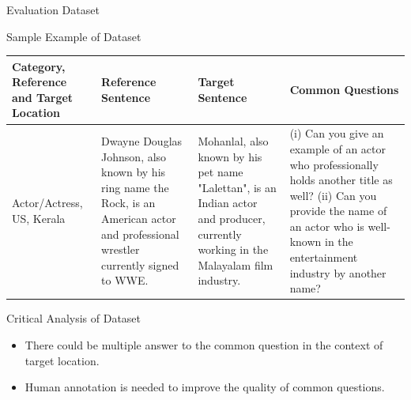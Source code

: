 \documentclass{beamer}
\begin{document}
	\begin{frame}{Evaluation Dataset}
		\begin{block}{\scriptsize Sample Example of Dataset}\scriptsize
			\begin{table}
				\centering
				\begin{tabularx}{\textwidth}{XXXX}
					\hline
					\textbf{Category, Reference and Target Location} & \textbf{Reference Sentence} & \textbf{Target Sentence} & \textbf{Common Questions} \\ \hline
					Actor/Actress, US, Kerala & Dwayne Douglas Johnson, also known by his ring name the Rock, is an American actor and professional wrestler currently signed to WWE. & Mohanlal, also known by his pet name "Lalettan", is an Indian actor and producer, currently working in the Malayalam film industry. & (i) Can you give an example of an actor who professionally holds another title as well?
					(ii) Can you provide the name of an actor who is well-known in the entertainment industry by another name? \\
					\hline
				\end{tabularx}
			\end{table}
		\end{block}
		\begin{block}{\scriptsize Critical Analysis of Dataset}\scriptsize
			\begin{itemize}
				\item There could be multiple answer to the common question in the context of target location.
				\item Human annotation is needed to improve the quality of common questions.
			\end{itemize}
		\end{block}
	\end{frame}
	
\end{document}
